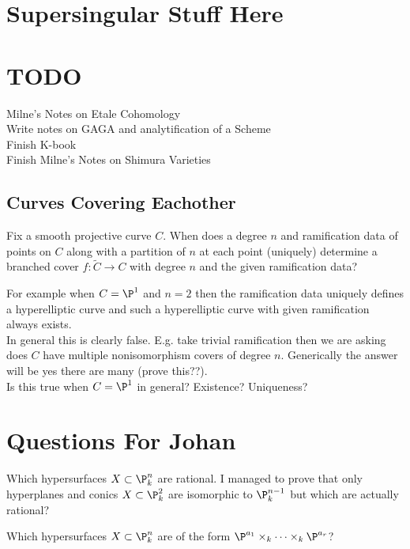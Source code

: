 \documentclass[12pt]{article}
\begin{document}
\section{Supersingular Stuff Here}

\section{TODO}

Milne's Notes on Etale Cohomology
\\
Write notes on GAGA and analytification of a Scheme
\\
Finish K-book
\\
Finish Milne's Notes on Shimura Varieties

\subsection{Curves Covering Eachother}

\begin{exercise}
Fix a smooth projective curve $C$. When does a degree $n$ and ramification data of points on $C$ along with a partition of $n$ at each point (uniquely) determine a branched cover $f : \tilde{C} \to C$ with degree $n$ and the given ramification data?
\end{exercise}

For example when $C = \P^1$ and $n = 2$ then the ramification data uniquely defines a hyperelliptic curve and such a hyperelliptic curve with given ramification always exists.
\bigskip\\
In general this is clearly false. E.g. take trivial ramification then we are asking does $C$ have multiple nonisomorphism \etale covers of degree $n$. Generically the answer will be yes there are many (prove this??).
\bigskip\\
Is this true when $C = \P^1$ in general? Existence? Uniqueness?

\section{Questions For Johan}

\begin{exercise}
Which hypersurfaces $X \subset \P^n_k$ are rational. I managed to prove that only hyperplanes and conics $X \subset \P^2_k$ are isomorphic to $\P^{n-1}_k$ but which are actually rational?
\end{exercise}

\begin{exercise}
Which hypersurfaces $X \subset \P^n_k$ are of the form $\P^{a_1} \times_k \cdots \times_k \P^{a_r}$?
\end{exercise}
\end{document}
